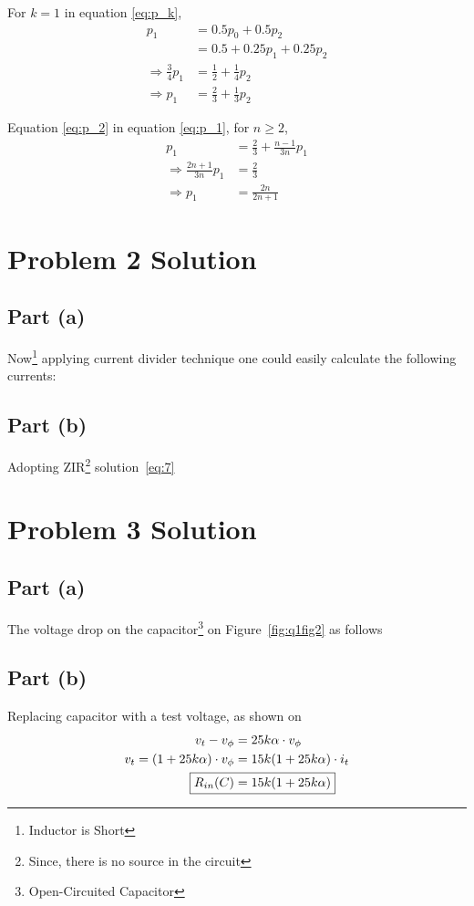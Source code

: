 \documentclass[11pt,a4paper,titlepage]{article}
\begin{document}
For $k = 1$ in equation \ref{eq:p_k},
\begin{align}
    p_1 &= 0.5 p_0 + 0.5 p_2 \nonumber \\
        &= 0.5 + 0.25 p_1 + 0.25 p_2 \nonumber \\
    \Rightarrow \frac{3}{4} p_1 &= \frac{1}{2} + \frac{1}{4} p_2 \nonumber \\
    \Rightarrow p_1 &= \frac{2}{3} + \frac{1}{3} p_2 \label{eq:p_1}
\end{align}

Equation \ref{eq:p_2} in equation \ref{eq:p_1}, for $n \ge 2$,
\begin{align*}
    p_1 &= \frac{2}{3} + \frac{n - 1}{3n} p_1 \\
    \Rightarrow \frac{2n + 1}{3n} p_1 &= \frac{2}{3} \\
    \Rightarrow p_1 &= \frac{2n}{2n + 1}
\end{align*}


\section{Problem 2 Solution}
\subsection*{Part (a)}
Now\footnote{Inductor is Short} applying current divider technique one could easily calculate the following currents:\par

\subsection*{Part (b)}
Adopting ZIR\footnote{Since, there is no source in the circuit} solution~\eqref{eq:7} 


\section{Problem 3 Solution}
\subsection*{Part (a)}
The voltage drop on the capacitor\footnote{Open-Circuited Capacitor } on Figure~\ref{fig:q1fig2} as follows

\subsection*{Part (b)}
Replacing capacitor with a test voltage, as shown on 
\begin{align}
v_t-v_{\phi}&=25k\alpha \cdot v_{\phi} \nonumber \\
v_t=(1+25k\alpha) \cdot v_{\phi}&=15k(1+25k\alpha) \cdot i_t \nonumber \\
\Aboxed{R_{in}(C)&=15k(1+25k\alpha) \label{eq:10}}
\end{align}
\end{document}
